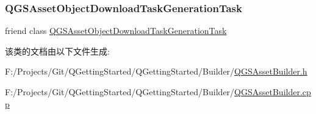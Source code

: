 \subsubsection{\texorpdfstring{Q\+G\+S\+Asset\+Object\+Download\+Task\+Generation\+Task}{QGSAssetObjectDownloadTaskGenerationTask}}
{\footnotesize\ttfamily friend class \mbox{\hyperlink{class_q_g_s_asset_object_download_task_generation_task}{Q\+G\+S\+Asset\+Object\+Download\+Task\+Generation\+Task}}\hspace{0.3cm}{\ttfamily [friend]}}



该类的文档由以下文件生成\+:\begin{DoxyCompactItemize}
\item 
F\+:/\+Projects/\+Git/\+Q\+Getting\+Started/\+Q\+Getting\+Started/\+Builder/\mbox{\hyperlink{_q_g_s_asset_builder_8h}{Q\+G\+S\+Asset\+Builder.\+h}}\item 
F\+:/\+Projects/\+Git/\+Q\+Getting\+Started/\+Q\+Getting\+Started/\+Builder/\mbox{\hyperlink{_q_g_s_asset_builder_8cpp}{Q\+G\+S\+Asset\+Builder.\+cpp}}\end{DoxyCompactItemize}
